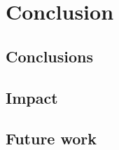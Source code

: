 \chapter{Conclusion} \label{chap:conclusion}

\section{Conclusions} \label{conclusion:sec:conclusions}

\section{Impact} \label{conclusion:sec:impact}

\section{Future work} \label{conclusion:sec:future}